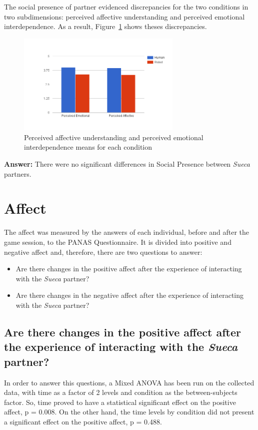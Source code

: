 The social presence of partner evidenced discrepancies for the two conditions in two subdimensions: perceived affective understanding and perceived emotional interdependence.
As a result, Figure~\ref{fig:perceiveEmoAff} shows theses discrepancies.

\begin{figure}[h!]
  \centering
    \includegraphics[width=0.7\textwidth]{./img/6/perceiveEmoAff}
  \caption{Perceived affective understanding and perceived emotional interdependence means for each  condition}
\label{fig:perceiveEmoAff}
\end{figure}

\textbf{Answer:} There were no significant differences in Social Presence between \emph{Sueca} partners.


\section{Affect}
\label{sec:affect}
The affect was measured by the answers of each individual, before and after the game session, to the PANAS Questionnaire.
It is divided into positive and negative affect and, therefore, there are two questions to answer:
\begin{itemize}
\item Are there changes in the positive affect after the experience of interacting with the \emph{Sueca} partner?
\item Are there changes in the negative affect after the experience of interacting with the \emph{Sueca} partner?
\end{itemize}

\subsection*{Are there changes in the positive affect after the experience of interacting with the \emph{Sueca} partner?}
In order to answer this questions, a Mixed ANOVA has been run on the collected data, with time as a factor of 2 levels and condition as the between-subjects factor.
So, time proved to have a statistical significant effect on the positive affect, p = 0.008.
On the other hand, the time levels by condition did not present a significant effect on the positive affect, p = 0.488.

